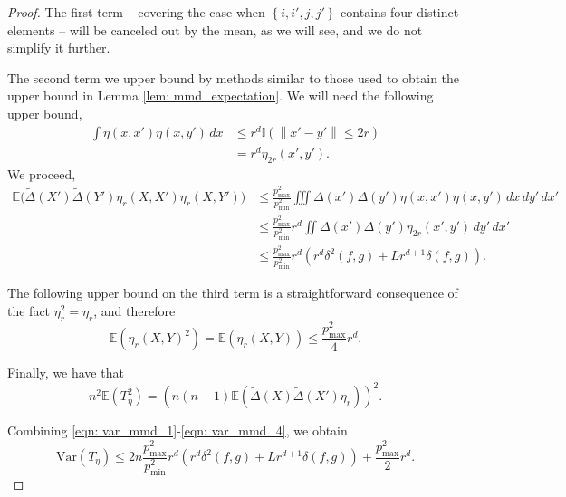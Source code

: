\documentclass{article}
\newcommand{\norm}[1]{\left\lVert#1\right\rVert}
\newcommand{\set}[1]{\left\{#1\right\}}
\newcommand{\Var}{\mathrm{Var}}
\newcommand{\1}{\mathbb{I}}
\newcommand{\Ebb}{\mathbb{E}}
\newcommand{\dx}{\,dx}
\newcommand{\dxpr}{\,dx'}
\newcommand{\dypr}{\,dy'}
\newcommand{\wt}[1]{\widetilde{#1}}
\theoremstyle{alden}
\theoremstyle{aldenthm}
\theoremstyle{definition}
\theoremstyle{remark}
\begin{document}
\begin{proof}
	The first term -- covering the case when $\set{i,i',j,j'}$ contains four distinct elements --  will be canceled out by the mean, as we will see, and we do not simplify it further. 
	
	The second term we upper bound by methods similar to those used to obtain the upper bound in Lemma \ref{lem: mmd_expectation}. We will need the following upper bound,
	\begin{align*}
	\int \eta(x,x') \eta(x,y') \dx & \leq r^d \1(\norm{x' - y'} \leq 2r) \\
	& = r^d \eta_{2r}(x',y').
	\end{align*}
	We proceed,
	\begin{align}
	\label{eqn: var_mmd_2}
	\Ebb \biggl(\widetilde{\Delta}(X') \wt{\Delta}(Y') \eta_r(X,X') \eta_r(X,Y') \biggr) & \leq \frac{p_{\max}^2}{p_{\min}^2} \iiint \Delta(x') \Delta(y') \eta(x,x') \eta(x,y') \dx \dypr \dxpr \nonumber\\
	& \leq \frac{p_{\max}^2}{p_{\min}^2} r^d \iint \Delta(x') \Delta(y') \eta_{2r}(x',y') \dypr \dxpr \nonumber \\
	& \leq \frac{p_{\max}^2}{p_{\min}^2} r^d \left(r^d \delta^2(f,g) + Lr^{d+1}\delta(f,g)\right).
	\end{align}
	
	The following upper bound on the third term is a straightforward consequence of the fact $\eta_r^2 = \eta_r$, and therefore
	\begin{equation}
	\label{eqn: var_mmd_3}
	\Ebb(\eta_r(X,Y)^2) = \Ebb(\eta_r(X,Y)) \leq \frac{p_{\max}^2}{4} r^d. 
	\end{equation}
	
	Finally, we have that
	\begin{equation}
	\label{eqn: var_mmd_4}
	n^2 \Ebb(T_{\eta}^2) = \left(n(n-1) \Ebb(\widetilde{\Delta}(X) \wt{\Delta}(X') \eta_r) \right)^2 .
	\end{equation}
	
	Combining \eqref{eqn: var_mmd_1}-\eqref{eqn: var_mmd_4}, we obtain
	\begin{equation*}
	\Var(T_\eta) \leq 2n \frac{p_{\max}^2}{p_{\min}^2} r^d \left(r^d \delta^2(f,g) + Lr^{d+1}\delta(f,g)\right) + \frac{p_{\max}^2}{2}r^d.
	\end{equation*}
\end{proof}
\end{document}
